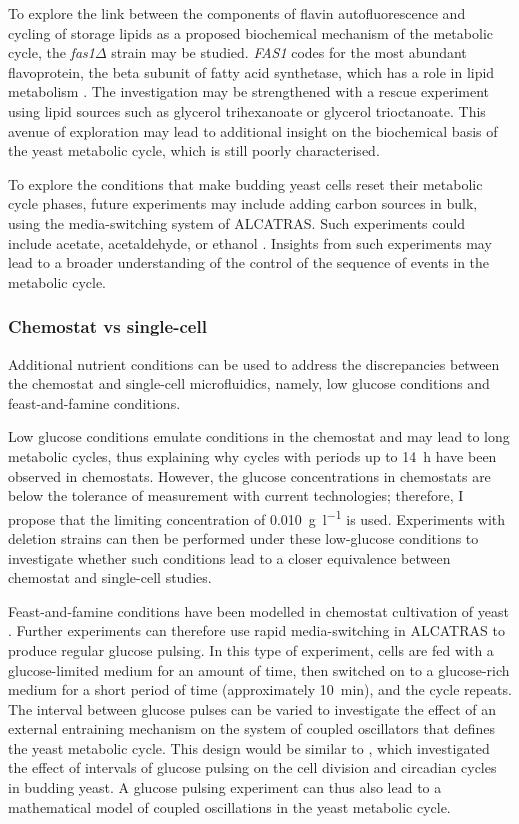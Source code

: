 To explore the link between the components of flavin autofluorescence and cycling of storage lipids as a proposed biochemical mechanism of the metabolic cycle, the \textit{fas1$\Delta$} strain may be studied.
\textit{FAS1} codes for the most abundant flavoprotein, the beta subunit of fatty acid synthetase, which has a role in lipid metabolism \parencite{gudipatiFlavoproteomeYeastSaccharomyces2014}.
The investigation may be strengthened with a rescue experiment using lipid sources such as glycerol trihexanoate or glycerol trioctanoate.
This avenue of exploration may lead to additional insight on the biochemical basis of the yeast metabolic cycle, which is still poorly characterised.

To explore the conditions that make budding yeast cells reset their metabolic cycle phases, future experiments may include adding carbon sources in bulk, using the media-switching system of ALCATRAS.
Such experiments could include acetate, acetaldehyde, or ethanol \parencite{kuangMsn2RegulateExpression2017, krishnaMinimalPushPull2018}.
Insights from such experiments may lead to a broader understanding of the control of the sequence of events in the metabolic cycle.


\subsubsection{Chemostat vs single-cell}
\label{subsec:biology-discussion-caveats-chemostat}

Additional nutrient conditions can be used to address the discrepancies between the chemostat and single-cell microfluidics, namely, low glucose conditions and feast-and-famine conditions.

Low glucose conditions emulate conditions in the chemostat and may lead to long metabolic cycles, thus explaining why cycles with periods up to \SI{14}{\hour} have been observed in chemostats.
However, the glucose concentrations in chemostats are below the tolerance of measurement with current technologies; therefore, I propose that the limiting concentration of \SI{0.010}{\gram~\litre^{-1}} is used.
Experiments with deletion strains can then be performed under these low-glucose conditions to investigate whether such conditions lead to a closer equivalence between chemostat and single-cell studies.

Feast-and-famine conditions have been modelled in chemostat cultivation of yeast \parencite{jonesCyberneticModelGrowth1999}.
Further experiments can therefore use rapid media-switching in ALCATRAS to produce regular glucose pulsing.
In this type of experiment, cells are fed with a glucose-limited medium for an amount of time, then switched on to a glucose-rich medium for a short period of time (approximately \SI{10}{\minute}), and the cycle repeats.
The interval between glucose pulses can be varied to investigate the effect of an external entraining mechanism on the system of coupled oscillators that defines the yeast metabolic cycle.
This design would be similar to \textcite{charvinForcedPeriodicExpression2009}, which investigated the effect of intervals of glucose pulsing on the cell division and circadian cycles in budding yeast.
A glucose pulsing experiment can thus also lead to a mathematical model of coupled oscillations in the yeast metabolic cycle.
